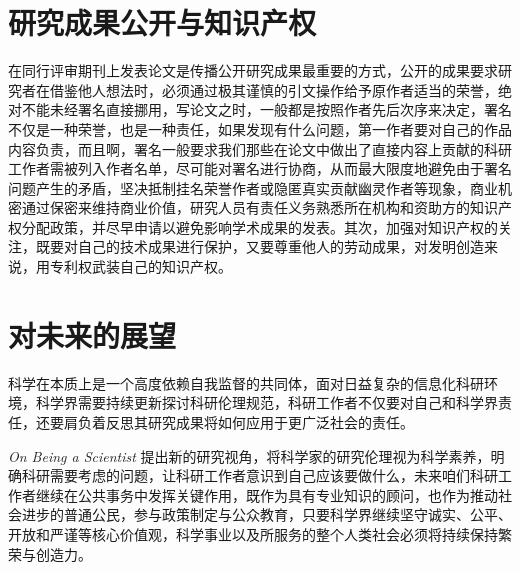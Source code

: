 \documentclass[12pt, hyperref, a4paper, UTF8]{ctexart}
\begin{document}
\section{研究成果公开与知识产权}
在同行评审期刊上发表论文是传播公开研究成果最重要的方式，公开的成果要求研究者在借鉴他人想法时，必须通过极其谨慎的引文操作给予原作者适当的荣誉，绝对不能未经署名直接挪用，写论文之时，一般都是按照作者先后次序来决定，署名不仅是一种荣誉，也是一种责任，如果发现有什么问题，第一作者要对自己的作品内容负责，而且啊，署名一般要求我们那些在论文中做出了直接内容上贡献的科研工作者需被列入作者名单，尽可能对署名进行协商，从而最大限度地避免由于署名问题产生的矛盾，坚决抵制挂名荣誉作者或隐匿真实贡献幽灵作者等现象，商业机密通过保密来维持商业价值，研究人员有责任义务熟悉所在机构和资助方的知识产权分配政策，并尽早申请以避免影响学术成果的发表。其次，加强对知识产权的关注，既要对自己的技术成果进行保护，又要尊重他人的劳动成果，对发明创造来说，用专利权武装自己的知识产权。



\section{对未来的展望}
科学在本质上是一个高度依赖自我监督的共同体，面对日益复杂的信息化科研环境，科学界需要持续更新探讨科研伦理规范，科研工作者不仅要对自己和科学界责任，还要肩负着反思其研究成果将如何应用于更广泛社会的责任。

\textit{On Being a Scientist} 提出新的研究视角，将科学家的研究伦理视为科学素养，明确科研需要考虑的问题，让科研工作者意识到自己应该要做什么，未来咱们科研工作者继续在公共事务中发挥关键作用，既作为具有专业知识的顾问，也作为推动社会进步的普通公民，参与政策制定与公众教育，只要科学界继续坚守诚实、公平、开放和严谨等核心价值观，科学事业以及所服务的整个人类社会必须将持续保持繁荣与创造力。
\end{document}
